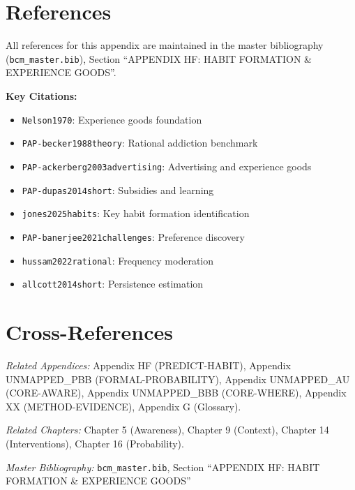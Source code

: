 \documentclass[11pt, a4paper]{article}
\begin{document}
\section{References}
\label{sec:lrn-references}

All references for this appendix are maintained in the master bibliography (\texttt{bcm\_master.bib}), Section ``APPENDIX HF: HABIT FORMATION \& EXPERIENCE GOODS''.

\textbf{Key Citations:}
\begin{itemize}[nosep]
    \item \texttt{Nelson1970}: Experience goods foundation
    \item \texttt{PAP-becker1988theory}: Rational addiction benchmark
    \item \texttt{PAP-ackerberg2003advertising}: Advertising and experience goods
    \item \texttt{PAP-dupas2014short}: Subsidies and learning
    \item \texttt{jones2025habits}: Key habit formation identification
    \item \texttt{PAP-banerjee2021challenges}: Preference discovery
    \item \texttt{hussam2022rational}: Frequency moderation
    \item \texttt{allcott2014short}: Persistence estimation
\end{itemize}


\section{Cross-References}
\label{sec:lrn-crossref}

\noindent\textit{Related Appendices:}
Appendix HF (PREDICT-HABIT),
Appendix UNMAPPED_PBB (FORMAL-PROBABILITY),
Appendix UNMAPPED_AU (CORE-AWARE),
Appendix UNMAPPED_BBB (CORE-WHERE),
Appendix XX (METHOD-EVIDENCE),
Appendix G (Glossary).

\noindent\textit{Related Chapters:}
Chapter 5 (Awareness),
Chapter 9 (Context),
Chapter 14 (Interventions),
Chapter 16 (Probability).

\noindent\textit{Master Bibliography:} \texttt{bcm\_master.bib}, Section ``APPENDIX HF: HABIT FORMATION \& EXPERIENCE GOODS''

\nocite{bcm_master}

\end{document}
